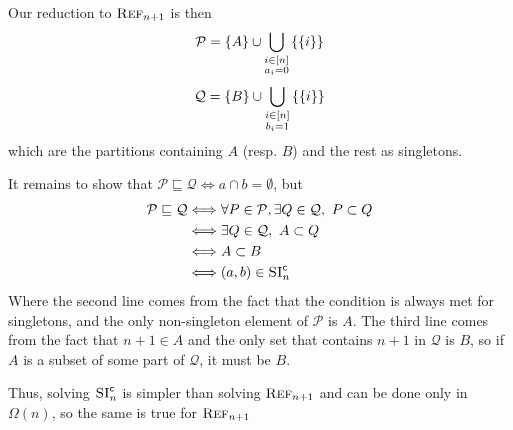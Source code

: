     Our reduction to $\textsc{Ref}_{n+1}$ is then 
    \[
        \mathcal P = \left\{ A \right\} \cup 
        \bigcup_{\substack{i \in [n] \\ a_i = 0}}
            \left\{ \left\{ i \right\} \right\}
    \]
    \[
        \mathcal Q = \left\{ B \right\} \cup 
        \bigcup_{\substack{i \in [n] \\ b_i = 1}}
            \left\{ \left\{ i \right\} \right\}
    \]
    which are the partitions containing $A$ (resp. $B$) and the rest as singletons.

    It remains to show that $\mathcal P \sqsubseteq \mathcal Q \iff a \cap b = \emptyset$, but
    \begin{align*}
        \mathcal P \sqsubseteq \mathcal Q 
        & \Longleftrightarrow \forall P \in \mathcal P, \exists Q \in \mathcal Q,~ P \subset Q
        \\& \Longleftrightarrow \exists Q \in \mathcal Q,~ A \subset Q
        \\& \Longleftrightarrow A \subset B
        \\& \Longleftrightarrow (a, b) \in \textsc{SI}^\mathsf{c}_n
    \end{align*}
    Where the second line comes from the fact that the condition is always met
    for singletons, and the only non-singleton element of $\mathcal P$
    is $A$. The third line comes from the fact that $n + 1 \in A$
    and the only set that contains $n + 1$ in $\mathcal Q$ is $B$, 
    so if $A$ is a subset of some part of $\mathcal Q$, it must be $B$.

    Thus, solving $\textsc{SI}^\mathsf{c}_n$ is simpler than solving $\textsc{Ref}_{n+1}$ and 
    can be done only in $\Omega(n)$, so the same is true for $\textsc{Ref}_{n+1}$


